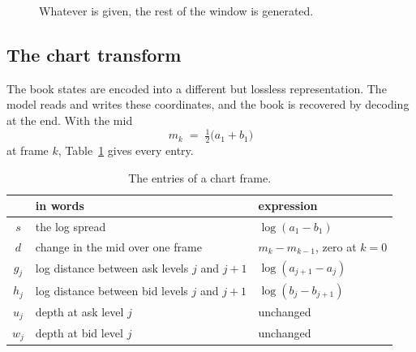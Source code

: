 \documentclass[10pt,a4paper]{article}
\begin{document}
\begin{figure}[H]
\centering
{}
\caption{Whatever is given, the rest of the window is generated.}
\label{fig:stream}
\end{figure}

\subsection{The chart transform}

The book states are encoded into a different but lossless representation. The
model reads and writes these coordinates, and the book is recovered by decoding
at the end. With the mid
%
\begin{equation}
m_k \;=\; \tfrac{1}{2}\bigl(a_1+b_1\bigr)
\label{eq:mid}
\end{equation}
%
at frame $k$, Table~\ref{tab:chart} gives every entry.

\begin{table}[H]
\centering\small
\begin{tabular}{cll}
\toprule
 & in words & expression \\
\midrule
$s$   & the log spread                    & $\log(a_1-b_1)$ \\
$d$   & change in the mid over one frame  & $m_k - m_{k-1}$, zero at $k=0$ \\
$g_j$ & log distance between ask levels $j$ and $j+1$ & $\log(a_{j+1}-a_j)$ \\
$h_j$ & log distance between bid levels $j$ and $j+1$ & $\log(b_j-b_{j+1})$ \\
$u_j$ & depth at ask level $j$            & unchanged \\
$w_j$ & depth at bid level $j$            & unchanged \\
\bottomrule
\end{tabular}
\caption{The entries of a chart frame.}
\label{tab:chart}
\end{table}
\end{document}
